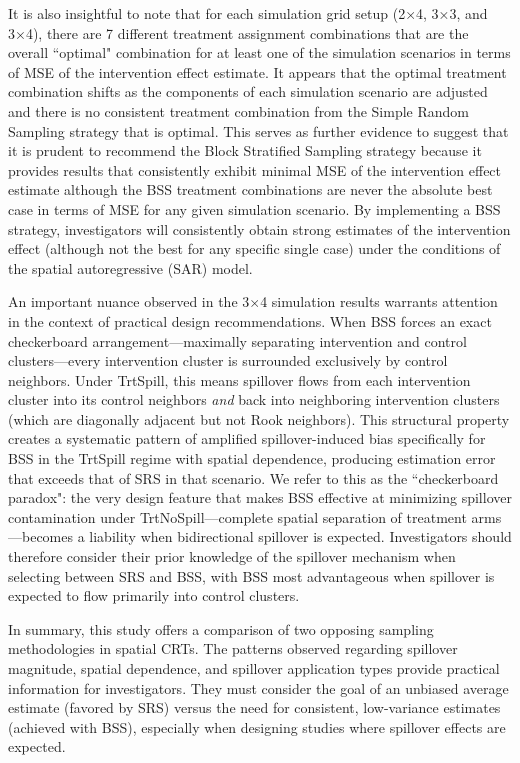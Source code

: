 \documentclass{article}[11pt]
\begin{document}
It is also insightful to note that for each simulation grid setup (2×4, 3×3, and 3×4), there are 7 different treatment assignment combinations that are the overall ``optimal" combination for at least one of the simulation scenarios in terms of MSE of the intervention effect estimate. It appears that the optimal treatment combination shifts as the components of each simulation scenario are adjusted and there is no consistent treatment combination from the Simple Random Sampling strategy that is optimal. This serves as further evidence to suggest that it is prudent to recommend the Block Stratified Sampling strategy because it provides results that consistently exhibit minimal MSE of the intervention effect estimate although the BSS treatment combinations are never the absolute best case in terms of MSE for any given simulation scenario. By implementing a BSS strategy, investigators will consistently obtain strong estimates of the intervention effect (although not the best for any specific single case) under the conditions of the spatial autoregressive (SAR) model.

An important nuance observed in the 3$\times$4 simulation results warrants attention in the context of practical design recommendations. When BSS forces an exact checkerboard arrangement---maximally separating intervention and control clusters---every intervention cluster is surrounded exclusively by control neighbors. Under TrtSpill, this means spillover flows from each intervention cluster into its control neighbors \emph{and} back into neighboring intervention clusters (which are diagonally adjacent but not Rook neighbors). This structural property creates a systematic pattern of amplified spillover-induced bias specifically for BSS in the TrtSpill regime with spatial dependence, producing estimation error that exceeds that of SRS in that scenario. We refer to this as the ``checkerboard paradox": the very design feature that makes BSS effective at minimizing spillover contamination under TrtNoSpill---complete spatial separation of treatment arms---becomes a liability when bidirectional spillover is expected. Investigators should therefore consider their prior knowledge of the spillover mechanism when selecting between SRS and BSS, with BSS most advantageous when spillover is expected to flow primarily into control clusters.

In summary, this study offers a comparison of two opposing sampling methodologies in spatial CRTs. The patterns observed regarding spillover magnitude, spatial dependence, and spillover application types provide practical information for investigators. They must consider the goal of an unbiased average estimate (favored by SRS) versus the need for consistent, low-variance estimates (achieved with BSS), especially when designing studies where spillover effects are expected.
\end{document}
